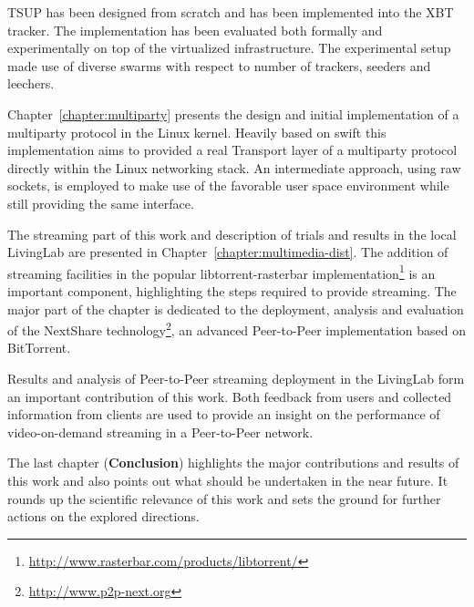 TSUP has been designed from scratch and has been implemented into the XBT
tracker. The implementation has been evaluated both formally and
experimentally on top of the virtualized infrastructure. The experimental
setup made use of diverse swarms with respect to number of trackers, seeders
and leechers.

Chapter~\ref{chapter:multiparty} presents the design and initial
implementation of a multiparty protocol in the Linux kernel. Heavily based on
swift this implementation aims to provided a real Transport layer of a
multiparty protocol directly within the Linux networking stack. An
intermediate approach, using raw sockets, is employed to make use of the
favorable user space environment while still providing the same interface.

The streaming part of this work and description of trials and results in the
local LivingLab are presented in Chapter~\ref{chapter:multimedia-dist}. The
addition of streaming facilities in the popular libtorrent-rasterbar
implementation\footnote{\url{http://www.rasterbar.com/products/libtorrent/}}
is an important component, highlighting the steps required to provide
streaming. The major part of the chapter is dedicated to the deployment,
analysis and evaluation of the NextShare
technology\footnote{\url{http://www.p2p-next.org}}, an advanced Peer-to-Peer
implementation based on BitTorrent.

Results and analysis of Peer-to-Peer streaming deployment in the LivingLab
form an important contribution of this work. Both feedback from users and
collected information from clients are used to provide an insight on the
performance of video-on-demand streaming in a Peer-to-Peer network.

The last chapter (\textbf{Conclusion}) highlights the major contributions and
results of this work and also points out what should be undertaken in the near
future. It rounds up the scientific relevance of this work and sets the ground
for further actions on the explored directions.
